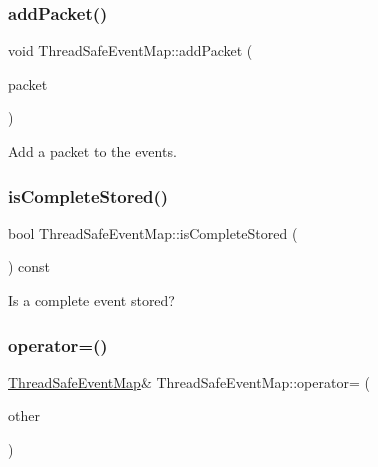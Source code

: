 \subsubsection{\texorpdfstring{add\+Packet()}{addPacket()}}
{\footnotesize\ttfamily void Thread\+Safe\+Event\+Map\+::add\+Packet (\begin{DoxyParamCaption}\item[{std\+::unique\+\_\+ptr$<$ \hyperlink{class_packet}{Packet} $>$}]{packet }\end{DoxyParamCaption})}



Add a packet to the events. 

\mbox{\label{class_thread_safe_event_map_a9fb58083137d147811de5b93f991d044}} 
\subsubsection{\texorpdfstring{is\+Complete\+Stored()}{isCompleteStored()}}
{\footnotesize\ttfamily bool Thread\+Safe\+Event\+Map\+::is\+Complete\+Stored (\begin{DoxyParamCaption}{ }\end{DoxyParamCaption}) const\hspace{0.3cm}{\ttfamily [inline]}}



Is a complete event stored? 

\mbox{\label{class_thread_safe_event_map_a1d438208fcc3936dd4384a8a2b55bdf8}} 
\subsubsection{\texorpdfstring{operator=()}{operator=()}\hspace{0.1cm}{\footnotesize\ttfamily [1/2]}}
{\footnotesize\ttfamily \hyperlink{class_thread_safe_event_map}{Thread\+Safe\+Event\+Map}\& Thread\+Safe\+Event\+Map\+::operator= (\begin{DoxyParamCaption}\item[{\hyperlink{class_thread_safe_event_map}{Thread\+Safe\+Event\+Map}}]{other }\end{DoxyParamCaption})\hspace{0.3cm}{\ttfamily [delete]}}


